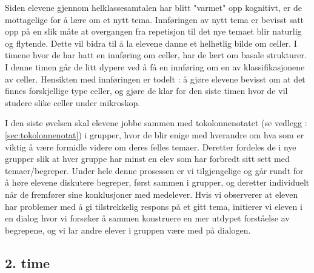 \documentclass[main.tex]{subfiles}
\begin{document}
Siden elevene gjennom helklassesamtalen har blitt "varmet" opp kognitivt, er de mottagelige for å 
lære om et nytt tema. Innføringen av nytt tema er bevisst satt opp på en slik måte at overgangen 
fra repetisjon til det nye temaet blir naturlig og flytende. Dette vil bidra til å la elevene danne et 
helhetlig bilde om celler. I timene hvor de har hatt en innføring om celler, har de lært om basale 
strukturer. I denne timen går de litt dypere ved å få en innføring om en av klassifikasjonene av celler.
Hensikten med innføringen er todelt : å gjøre elevene bevisst om at det finnes forskjellige type
celler, og gjøre de klar for den siste timen hvor de vil studere slike celler under mikroskop.

I den siste øvelsen skal elevene jobbe sammen med tokolonnenotatet (se 
vedlegg : \ref{sec:tokolonnenotat}) i grupper, hvor de blir enige med hverandre om hva som er viktig å 
være formidle videre om deres felles temaer. 
Deretter fordeles de i nye grupper slik at hver gruppe har minst en elev som har forbredt sitt sett 
med temaer/begreper. Under hele denne prosessen er vi tilgjengelige og går rundt for å høre elevene 
diskutere begreper, først sammen i grupper, og deretter individuelt når de fremfører sine 
konklusjoner med medelever. Hvis vi observerer at eleven har problemer med å gi tilstrekkelig 
respons på et gitt tema, initierer vi eleven i en dialog hvor vi forsøker å sammen konstruere en 
mer utdypet forståelse av begrepene, og vi lar andre elever i gruppen være med på dialogen. 

\subsection*{2. time}

\end{document}
